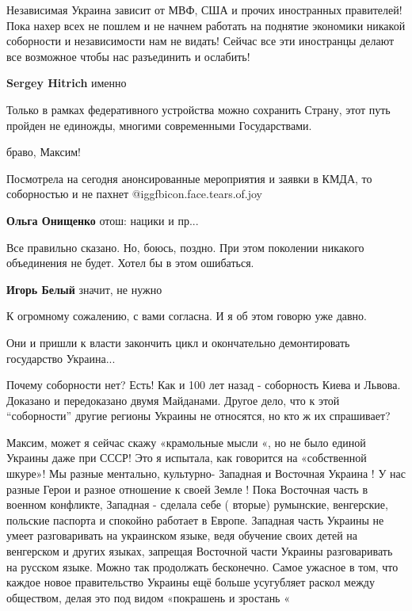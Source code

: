 \begin{itemize}

Независимая Украина зависит от МВФ, США и прочих иностранных правителей! Пока
нахер всех не пошлем и не начнем работать на поднятие экономики никакой
соборности и независимости нам не видать! Сейчас все эти иностранцы делают все
возможное чтобы нас разъединить и ослабить!


\textbf{Sergey Hitrich} именно


Только в рамках федеративного устройства можно сохранить Страну, этот путь
пройден не единожды, многими современными Государствами.

браво, Максим!


Посмотрела на сегодня анонсированные мероприятия и заявки в КМДА, то
соборностью и не пахнет @igg{fbicon.face.tears.of.joy} 

\textbf{Ольга Онищенко} отош: нацики и пр...

Все правильно сказано. Но, боюсь, поздно. При этом поколении никакого
объединения не будет. Хотел бы в этом ошибаться.

\begin{itemize} %
\textbf{Игорь Белый} значит, не нужно

К огромному сожалению, с вами согласна. И я об этом говорю уже давно.
\end{itemize} %

Они и пришли к власти закончить цикл и окончательно демонтировать государство Украина...


Почему соборности нет? Есть! Как и 100 лет назад - соборность Киева и Львова.
Доказано и передоказано двумя Майданами. Другое дело, что к этой \enquote{соборности}
другие регионы Украины не относятся, но кто ж их спрашивает?



Максим, может я сейчас скажу «крамольные мысли «, но не было единой Украины
даже при СССР! Это я испытала, как говорится на «собственной шкуре»! Мы разные
ментально, культурно- Западная и Восточная Украина ! У нас разные Герои и
разное отношение к своей Земле ! Пока Восточная часть в военном конфликте,
Западная - сделала себе ( вторые) румынские, венгерские, польские паспорта и
спокойно работает в Европе. Западная часть Украины не умеет разговаривать на
украинском языке, ведя обучение своих детей на венгерском и других языках,
запрещая Восточной части Украины разговаривать на русском языке. Можно так
продолжать бесконечно. Самое ужасное в том, что каждое новое правительство
Украины ещё больше усугубляет раскол между обществом, делая это под видом
«покрашень и зростань «


\end{itemize}
